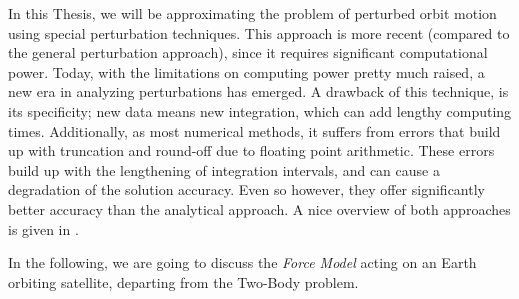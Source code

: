 In this Thesis, we will be approximating the problem of perturbed orbit motion 
using special perturbation techniques. This approach is more recent (compared to 
the general perturbation approach), since it requires significant computational 
power. Today, with the limitations on computing power pretty much raised, a new 
era in analyzing perturbations has emerged. A drawback of this technique, is its 
specificity; new data means new integration, which can add lengthy computing times. 
Additionally, as most numerical methods, it suffers from errors that build up with 
truncation and round-off due to floating point arithmetic. These errors build up 
with the lengthening of integration intervals, and can cause a degradation of the 
solution accuracy. Even so however, they offer significantly better accuracy than 
the analytical approach. A nice overview of both approaches is given in \cite{Vallado}.

In the following, we are going to discuss the \emph{Force Model} acting on an 
Earth orbiting satellite, departing from the Two-Body problem.